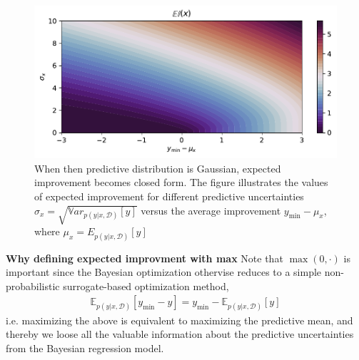 \begin{figure}%
    \centering
    \includegraphics[width=\textwidth]{Pictures/expected_improvement_illustration.pdf}
    \caption{When then predictive distribution is Gaussian, expected improvement becomes closed
    form. The figure illustrates the values of expected improvement for different predictive
    uncertainties $\sigma_x = \sqrt{\mathbb{V}ar_{p(y|x,\mathcal{D})}[y]}$ versus the average
    improvement $y_{\min}-\mu_x$, where $\mu_x = E_{p(y|x,\mathcal{D})}[y]$}
    \label{EI_illustration}
\end{figure}


\begin{note}
    \textbf{Why defining expected improvment with max}    
    Note that $\max(0,\cdot)$ is important since the Bayesian optimization othervise reduces to
    a simple non-probabilistic surrogate-based optimization method,
    \begin{align*}
        \mathbb{E}_{p(y|x,\mathcal{D})}[y_{\min}-y] = y_{\min} - \mathbb{E}_{p(y|x,\mathcal{D})}[y]
    \end{align*}
    i.e. maximizing the above is equivalent to maximizing the predictive mean, and thereby we loose
    all the valuable information about the predictive uncertainties from the Bayesian regression model. 
\end{note}

